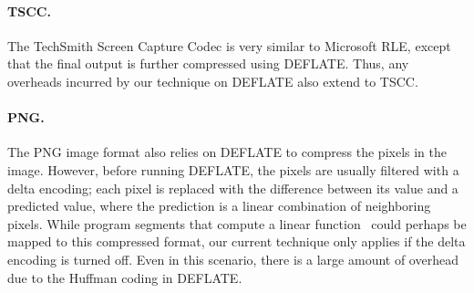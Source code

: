 \paragraph{TSCC.}
The TechSmith Screen Capture Codec is very similar to Microsoft RLE,
except that the final output is further compressed using DEFLATE.
Thus, any overheads incurred by our technique on DEFLATE also extend
to TSCC.

\paragraph{PNG.}
The PNG image format also relies on DEFLATE to compress the pixels in
the image.  However, before running DEFLATE, the pixels are usually
filtered with a delta encoding; each pixel is replaced with the
difference between its value and a predicted value, where the
prediction is a linear combination of neighboring pixels.  While
program segments that compute a linear function~\cite{aalamb} could
perhaps be mapped to this compressed format, our current technique
only applies if the delta encoding is turned off.  Even in this
scenario, there is a large amount of overhead due to the Huffman
coding in DEFLATE.
